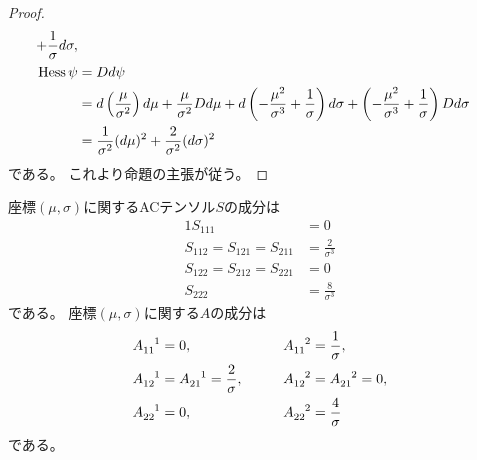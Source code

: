 \documentclass[report]{jlreq}
\begin{document}
\begin{proof}
\begin{alignat}{1}
{                    + \frac{1}{\sigma}
                }
                d\sigma,
                \\
        \operatorname{Hess}\psi
            &=
                Dd\psi
                \\
            &=
                d\left({
                    \frac{\mu}{\sigma^2}
                }\right)
                d\mu
                + \frac{\mu}{\sigma^2} Dd\mu
                + d\left({
                    - \frac{\mu^2}{\sigma^3}
                    + \frac{1}{\sigma}
                }\right)
                d\sigma
                + \left({
                    - \frac{\mu^2}{\sigma^3}
                    + \frac{1}{\sigma}
                }\right)
                Dd\sigma
                \\
            &=
                \frac{1}{\sigma^2} (d\mu)^2
                + \frac{2}{\sigma^2} (d\sigma)^2
    \end{alignat}
    である。
    これより命題の主張が従う。
\end{proof}

\begin{proposition}[ACテンソルの成分]
    座標$(\mu, \sigma)$に関するACテンソル$S$の成分は
    \begin{alignat}{1}
        S_{111}
            &=
                0
                \\
        S_{112} = S_{121} = S_{211}
            &=
                \frac{2}{\sigma^3}
                \\
        S_{122} = S_{212} = S_{221}
            &=
                0
                \\
        S_{222}
            &=
                \frac{8}{\sigma^3}
    \end{alignat}
    である。
    座標$(\mu, \sigma)$に関する$A$の成分は
    \begin{alignat}{2}
        A_{11}^{\hphantom{11}1}
            &=
                0,
                \qquad
        &A_{11}^{\hphantom{11}2}
            &=
                \frac{1}{\sigma},
                \\
        A_{12}^{\hphantom{12}1}
            &=
                A_{21}^{\hphantom{21}1}
            =
                \frac{2}{\sigma},
                \qquad
        &A_{12}^{\hphantom{12}2}
            &=
                A_{21}^{\hphantom{21}2}
            =
                0,
                \\
        A_{22}^{\hphantom{22}1}
            &=
                0,
                \qquad
        &A_{22}^{\hphantom{22}2}
            &=
                \frac{4}{\sigma}
    \end{alignat}
    である。
\end{proposition}
\end{document}
